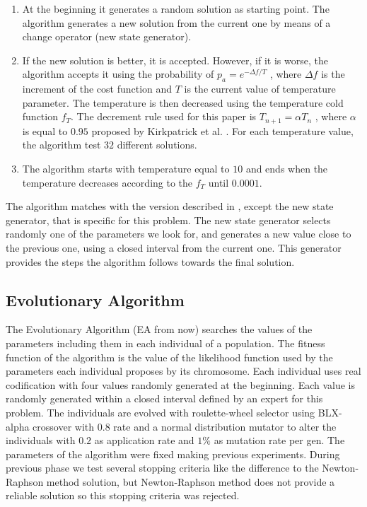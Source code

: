 \documentclass{sig-alternate}
\begin{document}
\begin{enumerate}
\item At the beginning it generates a random solution as starting point. The algorithm generates a new solution from the current one by means of a change operator (new state generator).
\item If the new solution is better, it is accepted. However, if it is worse, the algorithm accepts it using the probability of $p_a = e^{ - \Delta f / T }$ , where $\Delta f$  is the increment of the cost function and $T$ is the current value of temperature parameter. The temperature is then decreased using the temperature cold function $f_T$. The decrement rule used for this paper is $T_{n+1} = \alpha T_n$ , where $\alpha$ is equal to $0.95$ proposed by Kirkpatrick et al. \cite{Kirkpatrick83}.  For each temperature value, the algorithm test $32$ different solutions.
\item The algorithm starts with temperature equal to $10$ and ends when the temperature decreases according to the $f_T$ until $0.0001$.
\end{enumerate}

The algorithm matches with the version described in \cite{Michalewicz96}, except the new state generator, that is specific for this problem. The new state generator selects randomly one of the parameters we look for, and generates a new value close to the previous one, using a closed interval from the current one. This generator provides the steps the algorithm follows towards the final solution.


\subsection{Evolutionary Algorithm}
\label{subsec:EA}
The Evolutionary Algorithm (EA from now) \cite{EA} searches the values of the parameters including them in each individual of a population. The fitness function of the algorithm is the value of the likelihood function used by the parameters each individual proposes by its chromosome. Each individual uses real codification with four values randomly generated at the beginning. Each value is randomly generated within a closed interval defined by an expert for this problem. The individuals are evolved with roulette-wheel selector using BLX-alpha crossover \cite{blx} with $0.8$ rate and a normal distribution mutator to alter the individuals with $0.2$ as application rate and $1\%$ as mutation rate per gen. The parameters of the algorithm were fixed making previous experiments. During previous phase we test several stopping criteria like the difference to the Newton-Raphson method solution, but Newton-Raphson method does not provide a reliable solution so this stopping criteria was rejected.
\end{document}

